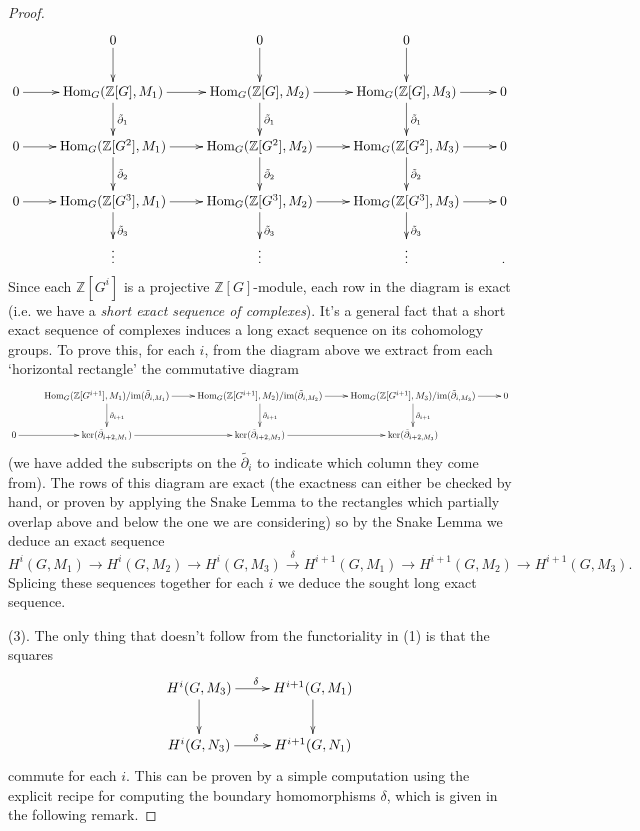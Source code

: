 \documentclass[11pt]{amsart}
\numberwithin{equation}{section}
\theoremstyle{remark}
\theoremstyle{remark}
\theoremstyle{remark}
\theoremstyle{definition}
\theoremstyle{definition}
\theoremstyle{definition}
\theoremstyle{definition}
\theoremstyle{definition}
\theoremstyle{definition}
\begin{document}
\begin{proof}
\[
\xymatrix{&0\ar[d]&0\ar[d]&0\ar[d]&\\0\ar[r]&\textup{Hom}_G(\mathbb{Z}[G],M_1)\ar[r]\ar[d]^{\tilde{\partial}_1}&\textup{Hom}_G(\mathbb{Z}[G],M_2)\ar[r]\ar[d]^{\tilde{\partial}_1}& \textup{Hom}_G(\mathbb{Z}[G],M_3)\ar[r]\ar[d]^{\tilde{\partial}_1}&0\\0\ar[r]&\textup{Hom}_G(\mathbb{Z}[G^2],M_1)\ar[r]\ar[d]^{\tilde{\partial}_2}&
\textup{Hom}_G(\mathbb{Z}[G^2],M_2)\ar[r]\ar[d]^{\tilde{\partial}_2} &\textup{Hom}_G(\mathbb{Z}[G^2],M_3)\ar[r]\ar[d]^{\tilde{\partial}_2}&0\\0\ar[r]&\textup{Hom}_G(\mathbb{Z}[G^3],M_1)\ar[r]\ar[d]^{\tilde{\partial}_3}&
\textup{Hom}_G(\mathbb{Z}[G^3],M_2)\ar[r]\ar[d]^{\tilde{\partial}_3} &\textup{Hom}_G(\mathbb{Z}[G^3],M_3)\ar[r]\ar[d]^{\tilde{\partial}_3}&0\\ &\vdots &\vdots &\vdots &.
}
\] 
Since each $\mathbb{Z}[G^i]$ is a projective $\mathbb{Z}[G]$-module, each row in the diagram is exact (i.e. we have a \textit{short exact sequence of complexes}). It's a general fact that a short exact sequence of complexes induces a long exact sequence on its cohomology groups. To prove this, for each $i$, from the diagram above we extract from each `horizontal rectangle' the commutative diagram
\[\scalebox{0.85}{\xymatrix{&\textup{Hom}_G(\mathbb{Z}[G^{i+1}],M_1)/\textup{im}(\tilde{\partial}_{i,M_1})\ar[r]\ar[d]^{\tilde{\partial}_{i+1}}&
\textup{Hom}_G(\mathbb{Z}[G^{i+1}],M_2)/\textup{im}(\tilde{\partial}_{i,M_2})\ar[r]\ar[d]^{\tilde{\partial}_{i+1}} &\textup{Hom}_G(\mathbb{Z}[G^{i+1}],M_3)/\textup{im}(\tilde{\partial}_{i,M_3})\ar[r]\ar[d]^{\tilde{\partial}_{i+1}}&0\\0\ar[r]&\ker(\tilde{\partial}_{i+2,M_1})\ar[r]&
\ker(\tilde{\partial}_{i+2,M_2})\ar[r] &\ker(\tilde{\partial}_{i+2,M_3})&}}\]
(we have added the subscripts on the $\tilde{\partial_i}$ to indicate which column they come from).  
The rows of this diagram are exact (the exactness can either be checked by hand, or proven by applying the Snake Lemma to the rectangles which partially overlap above and below the one we are considering) so by the Snake Lemma we deduce an exact sequence
\[H^i(G,M_1)\rightarrow H^i(G,M_2)\rightarrow H^i(G,M_3)\stackrel{\delta}{\longrightarrow}H^{i+1}(G,M_1)\rightarrow H^{i+1}(G,M_2)\rightarrow H^{i+1}(G,M_3).\]
Splicing these sequences together for each $i$ we deduce the sought long exact sequence.

(3). The only thing that doesn't follow from the functoriality in (1) is that the squares 
\[\xymatrix{H^i(G,M_3)\ar[r]^\delta\ar[d]& H^{i+1}(G,M_1)\ar[d]\\H^i(G,N_3)\ar[r]^\delta& H^{i+1}(G,N_1)}\]
commute for each $i$. This can be proven by a simple computation using the explicit recipe for computing the boundary homomorphisms $\delta$, which is given in the following remark. 
\end{proof}
\end{document}
